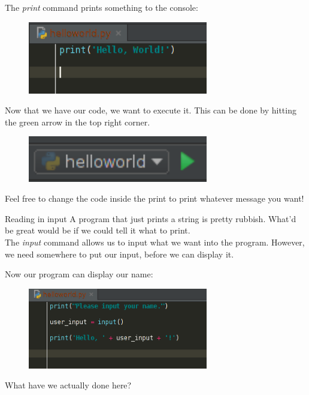 \documentclass{beamer}
\begin{document}
\begin{frame}
The \textit{print} command prints something to the console:
\begin{figure}[h]
\includegraphics[width=0.7\textwidth]{helloworld}
\end{figure}
\end{frame}

\begin{frame}
Now that we have our code, we want to execute it. This can be done by hitting the green arrow in the top right corner.
\begin{figure}[h]
\includegraphics[width=0.7\textwidth]{arrow}
\end{figure}

Feel free to change the code inside the print to print whatever message you want!
\end{frame}

\begin{frame}{Reading in input}
A program that just prints a string is pretty rubbish. What'd be great would be if we could tell it what to print.\\
\pause
The \textit{input} command allows us to input what we want into the program. However, we need somewhere to put our input, before we can display it.
\end{frame}

\begin{frame}
Now our program can display our name:
\begin{figure}[h]
\includegraphics[width=0.7\textwidth]{input}
\end{figure}
\pause
What have we actually done here?
\end{frame}
\end{document}

